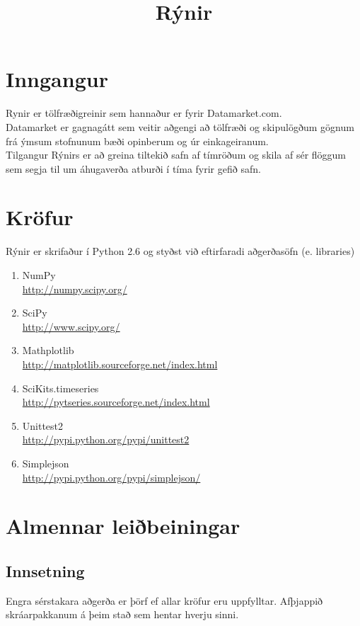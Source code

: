 \documentclass[11pt]{article}
\title{Rýnir}
\date{}
\begin{document}
\maketitle

\section{Inngangur}
Rynir er tölfræðigreinir sem hannaður er fyrir Datamarket.com.\\
Datamarket er gagnagátt sem veitir aðgengi að tölfræði og skipulögðum gögnum frá ýmsum stofnunum bæði opinberum og úr einkageiranum.\\
Tilgangur Rýnirs er að greina tiltekið safn af tímröðum og skila af sér flöggum sem segja til um áhugaverða atburði í tíma fyrir gefið safn.
 
\section{Kröfur}
Rýnir er skrifaður í Python 2.6 og styðst við eftirfaradi aðgerðasöfn (e. libraries)\\
\renewcommand{\theenumi}{\roman{enumi}}
\renewcommand{\labelenumi}{\theenumi}
\begin{enumerate}
 \item NumPy\\ \url{http://numpy.scipy.org/}
 \item SciPy\\ \url{http://www.scipy.org/}
 \item Mathplotlib\\ \url{http://matplotlib.sourceforge.net/index.html}
 \item SciKits.timeseries\\ \url{http://pytseries.sourceforge.net/index.html}
 \item Unittest2\\ \url{http://pypi.python.org/pypi/unittest2}
 \item Simplejson\\ \url{http://pypi.python.org/pypi/simplejson/}
\end{enumerate}

\section{Almennar leiðbeiningar}


\subsection{Innsetning}
Engra sérstakara aðgerða er þörf ef allar kröfur eru uppfylltar. Afþjappið skráarpakkanum á þeim stað sem hentar hverju sinni.
\end{document}
